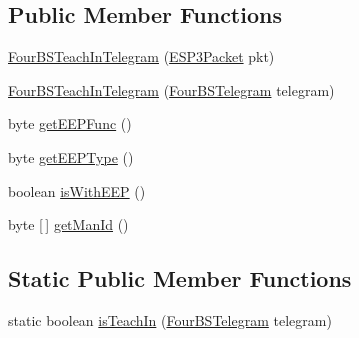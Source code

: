 \subsection*{Public Member Functions}
\begin{DoxyCompactItemize}
\item 
\hyperlink{classit_1_1polito_1_1elite_1_1enocean_1_1enj_1_1eep_1_1eep26_1_1telegram_1_1_four_b_s_teach_in_telegram_a42267971f5c3a51c872612701dc17c2c}{Four\+B\+S\+Teach\+In\+Telegram} (\hyperlink{classit_1_1polito_1_1elite_1_1enocean_1_1protocol_1_1serial_1_1v3_1_1network_1_1packet_1_1_e_s_p3_packet}{E\+S\+P3\+Packet} pkt)
\item 
\hyperlink{classit_1_1polito_1_1elite_1_1enocean_1_1enj_1_1eep_1_1eep26_1_1telegram_1_1_four_b_s_teach_in_telegram_a4a620134c49dfe914ed60b8bf4313d74}{Four\+B\+S\+Teach\+In\+Telegram} (\hyperlink{classit_1_1polito_1_1elite_1_1enocean_1_1enj_1_1eep_1_1eep26_1_1telegram_1_1_four_b_s_telegram}{Four\+B\+S\+Telegram} telegram)
\item 
byte \hyperlink{classit_1_1polito_1_1elite_1_1enocean_1_1enj_1_1eep_1_1eep26_1_1telegram_1_1_four_b_s_teach_in_telegram_a27333e589efc34292f3faa87c53fb6c4}{get\+E\+E\+P\+Func} ()
\item 
byte \hyperlink{classit_1_1polito_1_1elite_1_1enocean_1_1enj_1_1eep_1_1eep26_1_1telegram_1_1_four_b_s_teach_in_telegram_a87d4c0d29b5192187da65072e3b433b9}{get\+E\+E\+P\+Type} ()
\item 
boolean \hyperlink{classit_1_1polito_1_1elite_1_1enocean_1_1enj_1_1eep_1_1eep26_1_1telegram_1_1_four_b_s_teach_in_telegram_a00507b2fb0204843438d3b37b91a80a2}{is\+With\+E\+EP} ()
\item 
byte \mbox{[}$\,$\mbox{]} \hyperlink{classit_1_1polito_1_1elite_1_1enocean_1_1enj_1_1eep_1_1eep26_1_1telegram_1_1_four_b_s_teach_in_telegram_ad75a6e7a8470da4c4c3be5c0ff265293}{get\+Man\+Id} ()
\end{DoxyCompactItemize}
\subsection*{Static Public Member Functions}
\begin{DoxyCompactItemize}
\item 
static boolean \hyperlink{classit_1_1polito_1_1elite_1_1enocean_1_1enj_1_1eep_1_1eep26_1_1telegram_1_1_four_b_s_teach_in_telegram_a454852c77af74d45f337a9b142066728}{is\+Teach\+In} (\hyperlink{classit_1_1polito_1_1elite_1_1enocean_1_1enj_1_1eep_1_1eep26_1_1telegram_1_1_four_b_s_telegram}{Four\+B\+S\+Telegram} telegram)
\end{DoxyCompactItemize}
